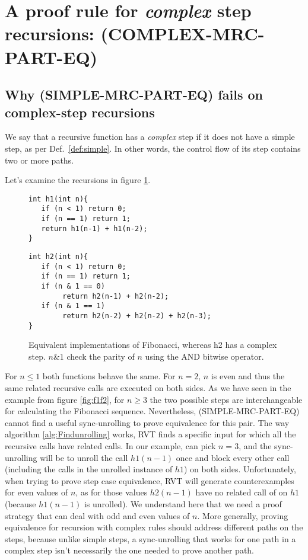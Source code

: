 \section{A proof rule for \emph{complex} step recursions: (COMPLEX-MRC-PART-EQ)}
\label{sec:multistep}
\subsection{Why (SIMPLE-MRC-PART-EQ) fails on complex-step recursions}
We say that a recursive function has a \emph{complex} step if it does not have a simple step, as per Def.~\ref{def:simple}. In other words, the control flow of its step contains two or more paths.

Let's examine the recursions in figure \ref{fig:f1f2cond}.
\begin{figure}[h]
\begin{center}
\begin{minipage}{7 cm}
\begin{lstlisting}
int h1(int n){
   if (n < 1) return 0;
   if (n == 1) return 1; 
   return h1(n-1) + h1(n-2);
}
\end{lstlisting}
\end{minipage}
\begin{minipage}{7 cm}
\begin{lstlisting}
int h2(int n){
   if (n < 1) return 0;
   if (n == 1) return 1; 
   if (n & 1 == 0)
        return h2(n-1) + h2(n-2);
   if (n & 1 == 1)
        return h2(n-2) + h2(n-2) + h2(n-3);
}
\end{lstlisting}
\end{minipage}
\caption{Equivalent implementations of Fibonacci, whereas h2 has a complex step. $n \& 1$ check the parity of $n$ using the AND bitwise operator.}
\label{fig:f1f2cond}
\end{center}
\end{figure}
For $n\leq 1$ both functions behave the same. For $n=2$, $n$ is even and thus the same related recursive calls are executed on both sides. As we have seen in the example from figure \ref{fig:f1f2}, for $n\geq3$ the two possible steps are interchangeable for calculating the Fibonacci sequence. Nevertheless, (SIMPLE-MRC-PART-EQ) cannot find a useful sync-unrolling to prove equivalence for this pair. The way algorithm \ref{alg:Findunrolling} works, RVT finds a specific input for which all the recursive calls have related calls. In our example,  can pick $n=3$, and the sync-unrolling will be to unroll the call $h1(n-1)$ once and block every other call (including the calls in the unrolled instance of $h1$) on both sides. Unfortunately, when trying to prove step case equivalence, RVT will generate counterexamples for even values of $n$, as for those values $h2(n-1)$ have no related call of on $h1$ (because $h1(n-1)$ is unrolled). We understand here that we need a proof strategy that can deal with odd and even values of $n$. More generally, proving equivalence for recursion with complex rules should address different paths on the steps, because unlike simple steps, a sync-unrolling that works for one path in a complex step isn't necessarily the one needed to prove another path.

